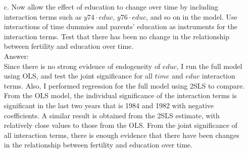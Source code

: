 \documentclass[10pt]{article}
\begin{document}
\begin{enumerate}
\item[c.] Now allow the effect of education to change over time by including interaction terms such as $y74\cdot educ$, $y76\cdot educ$, and so on in the model. Use interactions of time dummies and parents’ education as instruments for the interaction terms. Test that there has been no change in the relationship between fertility and education over time.
\\ Answer: \\
Since there is no strong evidence of endogeneity of $educ$, I run the full model using OLS, and test the joint significance for all $time$ and $educ$ interaction terms. Also, I performed regression for the full model using 2SLS to compare.\\

From the OLS model, the individual significance of the interaction terms is significant in the last two years that is 1984 and 1982 with negative coefficients. A similar result is obtained from the 2SLS estimate, with relatively close values to those from the OLS. From the joint significance of all interaction terms, there is enough evidence that there have been changes in the relationship between fertility and education over time.
\end{enumerate}
\end{document}
